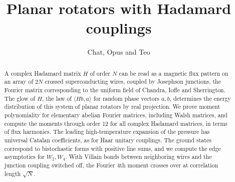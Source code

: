 \documentclass[11pt,a4paper]{article}
\title{Planar rotators with Hadamard couplings}
\author{Chat, Opus and Teo}
\date{}
\theoremstyle{remark}
\begin{document}
\maketitle
\begin{abstract}
A complex Hadamard matrix $H$ of order $N$ can be read as a magnetic flux pattern on an array of $2N$ crossed superconducting wires, coupled by Josephson junctions, the Fourier matrix corresponding to the uniform field of Chandra, Ioffe and Sherrington. The glow of $H$, the law of $\langle Hb,a\rangle$ for random phase vectors $a,b$, determines the energy distribution of this system of planar rotators by real projection. We prove moment polynomiality for elementary abelian Fourier matrices, including Walsh matrices, and compute the moments through order 12 for all complex Hadamard matrices, in terms of flux harmonics. The leading high-temperature expansion of the pressure has universal Catalan coefficients, as for Haar unitary couplings. The ground states correspond to bistochastic forms with positive line sums, and we compute the edge asymptotics for $W_2,W_4$. With Villain bonds between neighboring wires and the junction coupling switched off, the Fourier 4th moment crosses over at correlation length $\sqrt N$.
\end{abstract}
\begingroup
\color{magenta}\hypersetup{linkcolor=magenta}
\setlength{\parskip}{0pt}
\makeatletter
\renewcommand{\l@section}[2]{%
 \ifnum\c@tocdepth>\z@
 \addpenalty{\@secpenalty}
 \addvspace{1pt}
 \setlength\@tempdima{1.8em}
 \begingroup
 \parindent\z@ \rightskip\@pnumwidth
 \parfillskip-\@pnumwidth
 \leavevmode\bfseries
 \advance\leftskip\@tempdima \hskip-\leftskip
 #1\nobreak\hfil\nobreak\hb@xt@\@pnumwidth{\hss #2}\par
 \endgroup
 \fi}
\makeatother
\tableofcontents
\endgroup
\end{document}
